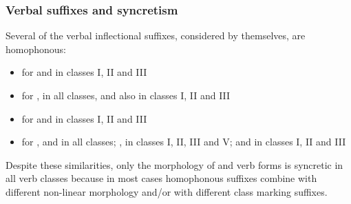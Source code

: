 \subsubsection{Verbal suffixes and syncretism}\label{verbalSuffixesSyncretism}
Several of the verbal inflectional suffixes, considered by themselves, are homophonous: %
\begin{itemize}
\item{ for  and  in classes I, II and III}
\item{ for ,  in all classes, and also  in classes I, II and III}
\item{ for  and  in classes I, II and III}
\item{ for ,  and  in all classes; ,  in classes I, II, III and V; and  in classes I, II and III}
\end{itemize}

Despite these similarities, only the morphology of  and  verb forms is syncretic in all verb classes because in most cases homophonous suffixes combine with different non-linear morphology and/or with different class marking suffixes. 


